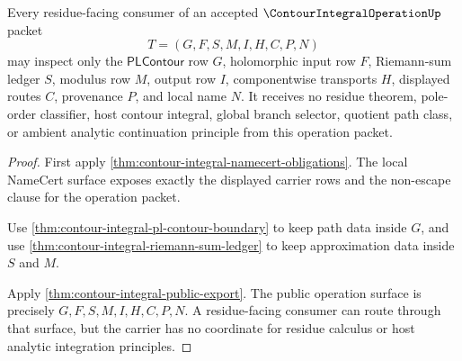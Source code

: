 \begin{theorem}
\label{thm:contour-integral-operation-residue-consumer-boundary}
Every residue-facing consumer of an accepted $\ContourIntegralOperationUp$ packet
$$
T=(G,F,S,M,I,H,C,P,N)
$$
may inspect only the $\mathsf{PLContour}$ row $G$, holomorphic input row $F$, Riemann-sum ledger $S$, modulus row $M$, output row $I$, componentwise transports $H$, displayed routes $C$, provenance $P$, and local name $N$. It receives no residue theorem, pole-order classifier, host contour integral, global branch selector, quotient path class, or ambient analytic continuation principle from this operation packet.
\end{theorem}
\begin{proof}
First apply \autoref{thm:contour-integral-namecert-obligations}. The local NameCert surface exposes exactly the displayed carrier rows and the non-escape clause for the operation packet.

Use \autoref{thm:contour-integral-pl-contour-boundary} to keep path data inside $G$, and use \autoref{thm:contour-integral-riemann-sum-ledger} to keep approximation data inside $S$ and $M$.

Apply \autoref{thm:contour-integral-public-export}. The public operation surface is precisely $G,F,S,M,I,H,C,P,N$. A residue-facing consumer can route through that surface, but the carrier has no coordinate for residue calculus or host analytic integration principles.
\end{proof}

